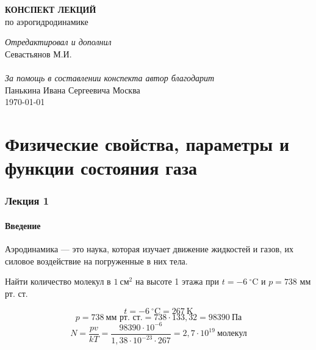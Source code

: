 


	\thispagestyle{empty}
	\vspace*{\fill}
	\begin{center}
		\Huge{\textbf{\MakeUppercase{конспект лекций}}}\\
		\huge{по аэрогидродинамике}
	\end{center}
	\vspace*{\fill}
	
	\newpage
	\thispagestyle{empty}
	\vspace*{\fill}
	\begin{center}
		\textit{Отредактировал и дополнил}\\
		Севастьянов М.И.\\
		\mbox{}\\
		\textit{За помощь в составлении конспекта автор благодарит}\\
		Панькина Ивана Сергеевича
		\vfill
		Москва\\\today
	\end{center}
	
	\newpage
	\tableofcontents
	
	\newpage
	\part{Физические свойства, параметры и функции состояния газа}
	
	\section{Лекция 1}
	
	\subsection{Введение}
	Аэродинамика --- это наука, которая изучает движение жидкостей и газов, их силовое воздействие на погруженные в них тела.
	\begin{problem}
		Найти количество молекул в $1\:\text{см}^2$ на высоте 1 этажа при $t = -6\:^{\circ}\text{C}$ и $p = 738$ мм рт. ст.
	\end{problem}
	\begin{solution}
		\[ t = -6\:^{\circ}\text{C} = 267\:\text{K} \]
		\[ p = 738\:\text{мм рт. ст.} = 738 \cdot 133,32 = 98390\:\text{Па} \]
		\[ N=\frac{pv}{kT}=\frac{98390\cdot10^{-6}}{1,38\cdot10^{-23}\cdot267}=\boxed{2,7\cdot10^{19}\:\text{молекул}} \]
	\end{solution}
	
